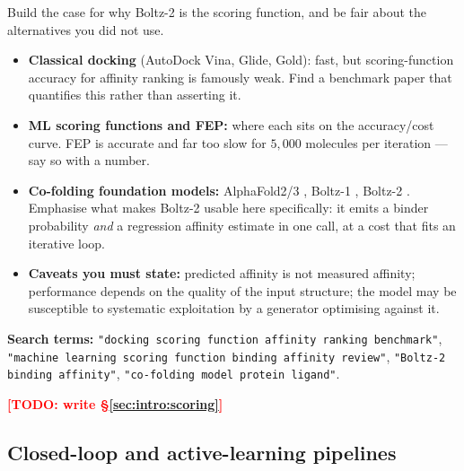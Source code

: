 \documentclass[11pt]{article}
\newcommand{\TODO}[1]{\textcolor{red}{\textbf{[TODO: #1]}}}
\begin{document}
\begin{yourturn}
Build the case for why Boltz-2 is the scoring function, and be fair about the
alternatives you did not use.
\begin{itemize}\itemsep0pt
  \item \textbf{Classical docking} (AutoDock Vina, Glide, Gold): fast, but
        scoring-function accuracy for affinity ranking is famously weak. Find a
        benchmark paper that quantifies this rather than asserting it.
  \item \textbf{ML scoring functions and FEP:} where each sits on the
        accuracy/cost curve. FEP is accurate and far too slow for
        $5{,}000$ molecules per iteration --- say so with a number.
  \item \textbf{Co-folding foundation models:} AlphaFold2/3
        \citep{jumper2021, abramson2024}, Boltz-1 \citep{wohlwend2024},
        Boltz-2 \citep{boltz2}. Emphasise what makes Boltz-2 usable here
        specifically: it emits a binder probability \emph{and} a regression
        affinity estimate in one call, at a cost that fits an iterative loop.
  \item \textbf{Caveats you must state:} predicted affinity is not measured
        affinity; performance depends on the quality of the input structure;
        the model may be susceptible to systematic exploitation by a generator
        optimising against it.
\end{itemize}
\textbf{Search terms:} \texttt{"docking scoring function affinity ranking
benchmark"}, \texttt{"machine learning scoring function binding affinity
review"}, \texttt{"Boltz-2 binding affinity"}, \texttt{"co-folding model
protein ligand"}.
\end{yourturn}

\TODO{write \S\ref{sec:intro:scoring}}

\subsection{Closed-loop and active-learning pipelines}
\label{sec:intro:closedloop}
\end{document}
